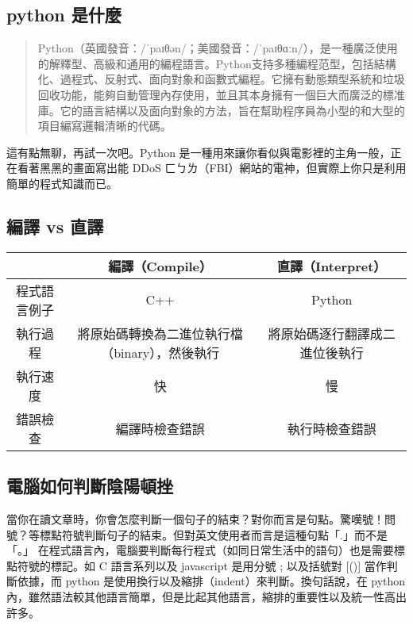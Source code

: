 \documentclass{article}
\begin{document}

\begin{large}

\section{python 是什麼}
    \begin{quote}
        Python（英國發音：/ˈpaɪθən/；美國發音：/ˈpaɪθɑːn/），是一種廣泛使用的解釋型、高級和通用的編程語言。Python支持多種編程范型，包括結構化、過程式、反射式、面向對象和函數式編程。它擁有動態類型系統和垃圾回收功能，能夠自動管理內存使用，並且其本身擁有一個巨大而廣泛的標准庫。它的語言結構以及面向對象的方法，旨在幫助程序員為小型的和大型的項目編寫邏輯清晰的代碼。
    \end{quote}
    這有點無聊，再試一次吧。Python 是一種用來讓你看似與電影裡的主角一般，正在看著黑黑的畫面寫出能
    DDoS ㄈㄅㄌ（FBI）網站的電神，但實際上你只是利用簡單的程式知識而已。

    \subsection{編譯 vs 直譯}
    \begin{tabular}{|c|c|c|}
\hline
& 編譯（Compile） & 直譯（Interpret） \\
\hline
程式語言例子 & C++ & Python \\
\hline
        執行過程 & 將原始碼轉換為二進位執行檔（binary），然後執行 &
        將原始碼逐行翻譯成二進位後執行 \\
\hline
執行速度 & 快 & 慢 \\
\hline
錯誤檢查 & 編譯時檢查錯誤 & 執行時檢查錯誤 \\
\hline
\end{tabular}
    \subsection{電腦如何判斷陰陽頓挫}
    當你在讀文章時，你會怎麼判斷一個句子的結束？對你而言是句點。驚嘆號！問號？等標點符號判斷句子的結束。但對英文使用者而言是這種句點「.」而不是「。」
    在程式語言內，電腦要判斷每行程式（如同日常生活中的語句）也是需要標點符號的標記。如 C
    語言系列以及 javascript 是用分號 ; 以及括號對 {[()]} 當作判斷依據，而 python
    是使用換行以及縮排（indent）來判斷。換句話說，在 python
    內，雖然語法較其他語言簡單，但是比起其他語言，縮排的重要性以及統一性高出許多。


\end{large}
\end{document}
